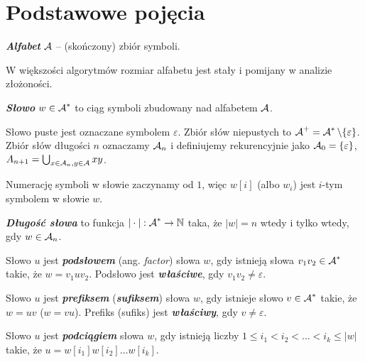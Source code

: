 \section{Podstawowe pojęcia}

\begin{definition}{}{}
  \textbf{\textit{Alfabet}} $\operatorname{\mathcal{A}}$ -- (skończony) zbiór symboli.
\end{definition}

W większości algorytmów rozmiar alfabetu jest stały i pomijany w analizie złożoności.

\begin{definition}{}{}
  \textbf{\textit{Słowo}} $w \in \operatorname{\mathcal{A}}^*$ to ciąg symboli zbudowany nad alfabetem $\operatorname{\mathcal{A}}$.
\end{definition}

Słowo puste jest oznaczane symbolem $\varepsilon$. Zbiór słów niepustych to $\operatorname{\mathcal{A}}^+ = \operatorname{\mathcal{A}}^* \setminus \{\varepsilon\}$.
Zbiór słów długości $n$ oznaczamy $\operatorname{\mathcal{A}}_n$ i definiujemy rekurencyjnie jako $\operatorname{\mathcal{A}}_0 = \{\varepsilon\}$, $A_{n + 1} = \bigcup_{x \in \operatorname{\mathcal{A}}_n, y \in \operatorname{\mathcal{A}}} xy$. 

Numerację symboli w słowie zaczynamy od $1$, więc $w[i]$ (albo $w_i$) jest $i$-tym symbolem w słowie $w$.

\begin{definition}{}{}
  \textbf{\textit{Długość słowa}} to funkcja $|\cdot|: \operatorname{\mathcal{A}}^* \to \mathbb{N}$  taka, że $|w| = n$ wtedy i tylko wtedy, gdy $w \in \operatorname{\mathcal{A}}_n$.
\end{definition}

\begin{definition}{}{}
  Słowo $u$ jest \textbf{\textit{podsłowem}} (ang. \emph{factor}) słowa $w$, gdy istnieją słowa $v_1 v_2 \in \operatorname{\mathcal{A}}^*$ takie, że $w = v_1 u v_2$.
  Podsłowo jest \textbf{\textit{właściwe}}, gdy $v_1 v_2 \neq \varepsilon$.
\end{definition}


\begin{definition}{}{}
  Słowo $u$ jest \textbf{\textit{prefiksem}} (\textbf{\textit{sufiksem}}) słowa $w$, gdy istnieje słowo $v \in \operatorname{\mathcal{A}}^*$ takie, że $w = u v$ ($w = v u$).
  Prefiks (sufiks) jest \textbf{\textit{właściwy}}, gdy $v \neq \varepsilon$.
\end{definition}

\begin{definition}{}{}
  Słowo $u$ jest \textbf{\textit{podciągiem}} słowa $w$, gdy istnieją liczby $1 \le i_1 < i_2 < \ldots < i_k \le |w|$ takie, że $u = w[i_1] w[i_2] \ldots w[i_k]$.
\end{definition}

